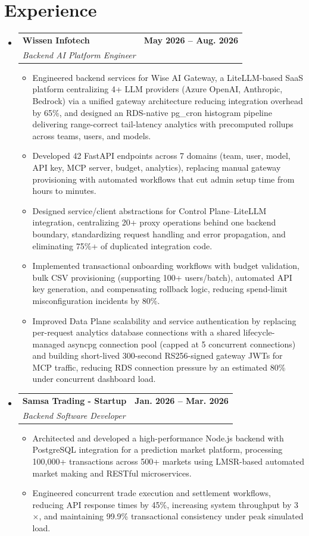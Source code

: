 \documentclass[letterpaper,10.5pt]{article}
\makeatletter
\newcommand{\resumeItem}[1]{
  \item\small{
    {#1 \vspace{-2pt}}
  }
}
\newcommand{\resumeSubheading}[4]{
  \vspace{-3pt}\item
    \begin{tabular*}{1.0\textwidth}[t]{l@{\extracolsep{\fill}}r}
      \textbf{#1} & \textbf{\small #2} \\
      \textit{\small#3} & \textit{\small #4} \\
    \end{tabular*}\vspace{-7pt}
}
\newcommand{\resumeSubHeadingListStart}{\begin{itemize}[leftmargin=0.0in, label={}, topsep=0pt, itemsep=0pt, parsep=0pt]}
\newcommand{\resumeSubHeadingListEnd}{\end{itemize}}
\newcommand{\resumeItemListStart}{\begin{itemize}[topsep=-1pt, itemsep=-2pt, parsep=0pt, partopsep=0pt]}
\newcommand{\resumeItemListEnd}{\end{itemize}\vspace{-5pt}}
\makeatother
\begin{document}
\section{Experience}
\resumeSubHeadingListStart
\resumeSubheading{Wissen Infotech}{May 2026 -- Aug. 2026}{Backend AI Platform Engineer }{}
\resumeItemListStart
\resumeItem{Engineered backend services for Wise AI Gateway, a LiteLLM-based SaaS platform centralizing 4+ LLM providers (Azure OpenAI, Anthropic, Bedrock) via a unified gateway architecture reducing integration overhead by 65\%, and designed an RDS-native pg\_cron histogram pipeline delivering range-correct tail-latency analytics with precomputed rollups across teams, users, and models.}
\resumeItem{Developed 42 FastAPI endpoints across 7 domains (team, user, model, API key, MCP server, budget, analytics), replacing manual gateway provisioning with automated workflows that cut admin setup time from hours to minutes.}
\resumeItem{Designed service/client abstractions for Control Plane--LiteLLM integration, centralizing 20+ proxy operations behind one backend boundary, standardizing request handling and error propagation, and eliminating 75\%+ of duplicated integration code.}
\resumeItem{Implemented transactional onboarding workflows with budget validation, bulk CSV provisioning (supporting 100+ users/batch), automated API key generation, and compensating rollback logic, reducing spend-limit misconfiguration incidents by 80\%.}
\resumeItem{Improved Data Plane scalability and service authentication by replacing per-request analytics database connections with a shared lifecycle-managed asyncpg connection pool (capped at 5 concurrent connections) and building short-lived 300-second RS256-signed gateway JWTs for MCP traffic, reducing RDS connection pressure by an estimated 80\% under concurrent dashboard load.}
\resumeItemListEnd

\resumeSubheading{Samsa Trading - Startup}{Jan. 2026 -- Mar. 2026}{Backend Software Developer}{}
\resumeItemListStart
\resumeItem{Architected and developed a high-performance Node.js backend with PostgreSQL integration for a prediction market platform, processing 100,000+ transactions across 500+ markets using LMSR-based automated market making and RESTful microservices.}
\resumeItem{Engineered concurrent trade execution and settlement workflows, reducing API response times by 45\%, increasing system throughput by 3$\times$, and maintaining 99.9\% transactional consistency under peak simulated load.}
\resumeItemListEnd
\resumeSubHeadingListEnd
\vspace{-16pt}
\end{document}
